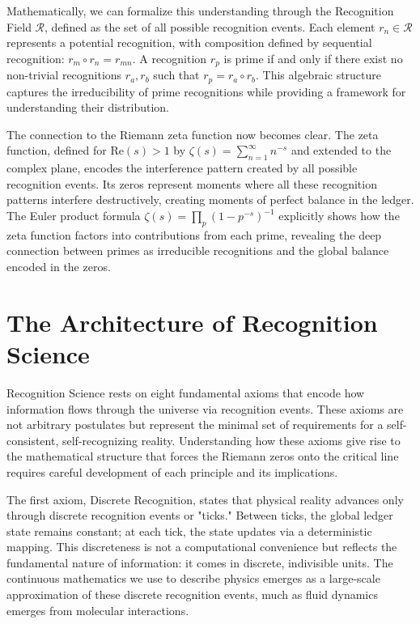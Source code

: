\documentclass[12pt]{article}
\begin{document}
Mathematically, we can formalize this understanding through the Recognition Field $\mathcal{R}$, defined as the set of all possible recognition events. Each element $r_n \in \mathcal{R}$ represents a potential recognition, with composition defined by sequential recognition: $r_m \circ r_n = r_{mn}$. A recognition $r_p$ is prime if and only if there exist no non-trivial recognitions $r_a, r_b$ such that $r_p = r_a \circ r_b$. This algebraic structure captures the irreducibility of prime recognitions while providing a framework for understanding their distribution.

The connection to the Riemann zeta function now becomes clear. The zeta function, defined for $\mathrm{Re}(s) > 1$ by $\zeta(s) = \sum_{n=1}^{\infty} n^{-s}$ and extended to the complex plane, encodes the interference pattern created by all possible recognition events. Its zeros represent moments where all these recognition patterns interfere destructively, creating moments of perfect balance in the ledger. The Euler product formula $\zeta(s) = \prod_p (1-p^{-s})^{-1}$ explicitly shows how the zeta function factors into contributions from each prime, revealing the deep connection between primes as irreducible recognitions and the global balance encoded in the zeros.

\section{The Architecture of Recognition Science}

Recognition Science rests on eight fundamental axioms that encode how information flows through the universe via recognition events. These axioms are not arbitrary postulates but represent the minimal set of requirements for a self-consistent, self-recognizing reality. Understanding how these axioms give rise to the mathematical structure that forces the Riemann zeros onto the critical line requires careful development of each principle and its implications.

The first axiom, Discrete Recognition, states that physical reality advances only through discrete recognition events or "ticks." Between ticks, the global ledger state remains constant; at each tick, the state updates via a deterministic mapping. This discreteness is not a computational convenience but reflects the fundamental nature of information: it comes in discrete, indivisible units. The continuous mathematics we use to describe physics emerges as a large-scale approximation of these discrete recognition events, much as fluid dynamics emerges from molecular interactions.
\end{document}
